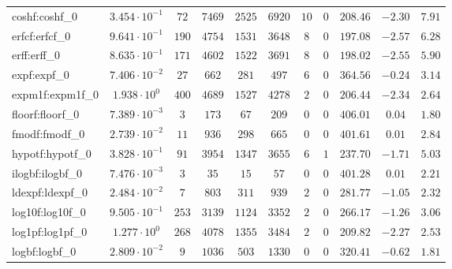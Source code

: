\begin{tabular}{|l|c|c|c|c|c|c|c|c|c|c|}
coshf:coshf\_0               & $ 3.454 \cdot 10^{-1} $ & $ 72     $ & $ 7469   $ & $ 2525  $ & $ 6920   $ & $ 10  $ & $ 0 $ & $ 208.46      $ & $ -2.30   $ & $ 7.91    $ \\
erfcf:erfcf\_0               & $ 9.641 \cdot 10^{-1} $ & $ 190    $ & $ 4754   $ & $ 1531  $ & $ 3648   $ & $ 8   $ & $ 0 $ & $ 197.08      $ & $ -2.57   $ & $ 6.28    $ \\
erff:erff\_0                 & $ 8.635 \cdot 10^{-1} $ & $ 171    $ & $ 4602   $ & $ 1522  $ & $ 3691   $ & $ 8   $ & $ 0 $ & $ 198.02      $ & $ -2.55   $ & $ 5.90    $ \\
expf:expf\_0                 & $ 7.406 \cdot 10^{-2} $ & $ 27     $ & $ 662    $ & $ 281   $ & $ 497    $ & $ 6   $ & $ 0 $ & $ 364.56      $ & $ -0.24   $ & $ 3.14    $ \\
expm1f:expm1f\_0             & $ 1.938 \cdot 10^{0}  $ & $ 400    $ & $ 4689   $ & $ 1527  $ & $ 4278   $ & $ 2   $ & $ 0 $ & $ 206.44      $ & $ -2.34   $ & $ 2.64    $ \\
floorf:floorf\_0             & $ 7.389 \cdot 10^{-3} $ & $ 3      $ & $ 173    $ & $ 67    $ & $ 209    $ & $ 0   $ & $ 0 $ & $ 406.01      $ & $ 0.04    $ & $ 1.80    $ \\
fmodf:fmodf\_0               & $ 2.739 \cdot 10^{-2} $ & $ 11     $ & $ 936    $ & $ 298   $ & $ 665    $ & $ 0   $ & $ 0 $ & $ 401.61      $ & $ 0.01    $ & $ 2.84    $ \\
hypotf:hypotf\_0             & $ 3.828 \cdot 10^{-1} $ & $ 91     $ & $ 3954   $ & $ 1347  $ & $ 3655   $ & $ 6   $ & $ 1 $ & $ 237.70      $ & $ -1.71   $ & $ 5.03    $ \\
ilogbf:ilogbf\_0             & $ 7.476 \cdot 10^{-3} $ & $ 3      $ & $ 35     $ & $ 15    $ & $ 57     $ & $ 0   $ & $ 0 $ & $ 401.28      $ & $ 0.01    $ & $ 2.21    $ \\
ldexpf:ldexpf\_0             & $ 2.484 \cdot 10^{-2} $ & $ 7      $ & $ 803    $ & $ 311   $ & $ 939    $ & $ 2   $ & $ 0 $ & $ 281.77      $ & $ -1.05   $ & $ 2.32    $ \\
log10f:log10f\_0             & $ 9.505 \cdot 10^{-1} $ & $ 253    $ & $ 3139   $ & $ 1124  $ & $ 3352   $ & $ 2   $ & $ 0 $ & $ 266.17      $ & $ -1.26   $ & $ 3.06    $ \\
log1pf:log1pf\_0             & $ 1.277 \cdot 10^{0}  $ & $ 268    $ & $ 4078   $ & $ 1355  $ & $ 3484   $ & $ 2   $ & $ 0 $ & $ 209.82      $ & $ -2.27   $ & $ 2.53    $ \\
logbf:logbf\_0               & $ 2.809 \cdot 10^{-2} $ & $ 9      $ & $ 1036   $ & $ 503   $ & $ 1330   $ & $ 0   $ & $ 0 $ & $ 320.41      $ & $ -0.62   $ & $ 1.81    $ \\

\end{tabular}
